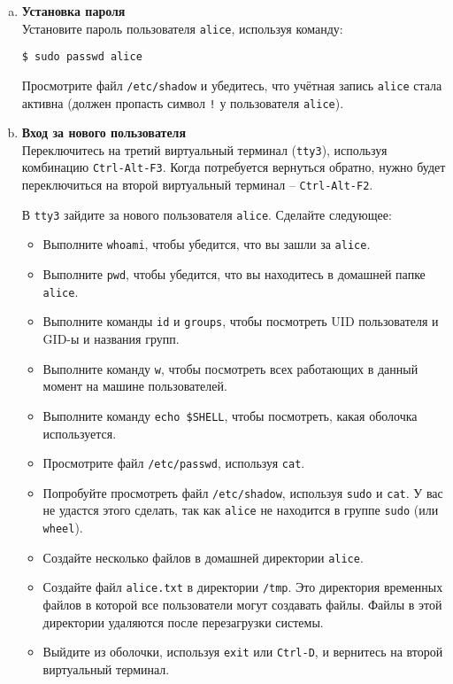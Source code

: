 \documentclass{article}
\begin{document}
\begin{enumerate}[a.]
\item \textbf{Установка пароля}\\
Установите пароль пользователя \texttt{alice}, используя команду:
\begin{lstlisting}
$ sudo passwd alice
\end{lstlisting}
Просмотрите файл \texttt{/etc/shadow} и убедитесь, что учётная запись \texttt{alice} стала активна (должен пропасть символ \texttt{!} у пользователя \texttt{alice}).

\item \textbf{Вход за нового пользователя}\\
Переключитесь на третий виртуальный терминал (\texttt{tty3}), используя комбинацию \texttt{Ctrl-Alt-F3}. Когда потребуется вернуться обратно, нужно будет переключиться на второй виртуальный терминал -- \texttt{Ctrl-Alt-F2}.

В \texttt{tty3} зайдите за нового пользователя \texttt{alice}. Сделайте следующее:
\begin{itemize}
\item Выполните \texttt{whoami}, чтобы убедится, что вы зашли за \texttt{alice}.
\item Выполните \texttt{pwd}, чтобы убедится, что вы находитесь в домашней папке \texttt{alice}.
\item Выполните команды \texttt{id} и \texttt{groups}, чтобы посмотреть UID пользователя и GID-ы и названия групп.
\item Выполните команду \texttt{w}, чтобы посмотреть всех работающих в данный момент на машине пользователей.
\item Выполните команду \texttt{echo \$SHELL}, чтобы посмотреть, какая оболочка используется.
\item Просмотрите файл \texttt{/etc/passwd}, используя \texttt{cat}.
\item Попробуйте просмотреть файл \texttt{/etc/shadow}, используя \texttt{sudo} и \texttt{cat}. У вас не удастся этого сделать, так как \texttt{alice} не находится в группе \texttt{sudo} (или \texttt{wheel}).
\item Создайте несколько файлов в домашней директории \texttt{alice}.
\item Создайте файл \texttt{alice.txt} в директории \texttt{/tmp}. Это директория временных файлов в которой все пользователи могут создавать файлы. Файлы в этой директории удаляются после перезагрузки системы.
\item Выйдите из оболочки, используя \texttt{exit} или \texttt{Ctrl-D}, и вернитесь на второй виртуальный терминал.
\end{itemize}
\end{enumerate}
\end{document}
